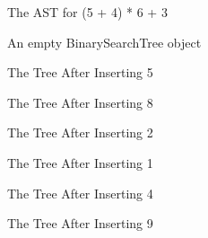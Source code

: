 \documentclass[letterpaper,10pt,english]{sphinxmanual}
\begin{document}
\begin{figure}[htbp]
\centering
\capstart

\noindent{}
\caption{The AST for (5 + 4) * 6 + 3}\label{\detokenize{chap6/chap6:id2}}\end{figure}

\begin{figure}[htbp]
\centering
\capstart

\noindent{}
\caption{An empty BinarySearchTree object}\label{\detokenize{chap6/chap6:id3}}\end{figure}

\begin{figure}[htbp]
\centering
\capstart

\noindent{}
\caption{The Tree After Inserting 5}\label{\detokenize{chap6/chap6:id4}}\end{figure}

\begin{figure}[htbp]
\centering
\capstart

\noindent{}
\caption{The Tree After Inserting 8}\label{\detokenize{chap6/chap6:id5}}\end{figure}

\begin{figure}[htbp]
\centering
\capstart

\noindent{}
\caption{The Tree After Inserting 2}\label{\detokenize{chap6/chap6:id6}}\end{figure}

\begin{figure}[htbp]
\centering
\capstart

\noindent{}
\caption{The Tree After Inserting 1}\label{\detokenize{chap6/chap6:id7}}\end{figure}

\begin{figure}[htbp]
\centering
\capstart

\noindent{}
\caption{The Tree After Inserting 4}\label{\detokenize{chap6/chap6:id8}}\end{figure}

\begin{figure}[htbp]
\centering
\capstart

\noindent{}
\caption{The Tree After Inserting 9}\label{\detokenize{chap6/chap6:id9}}\end{figure}
\end{document}

